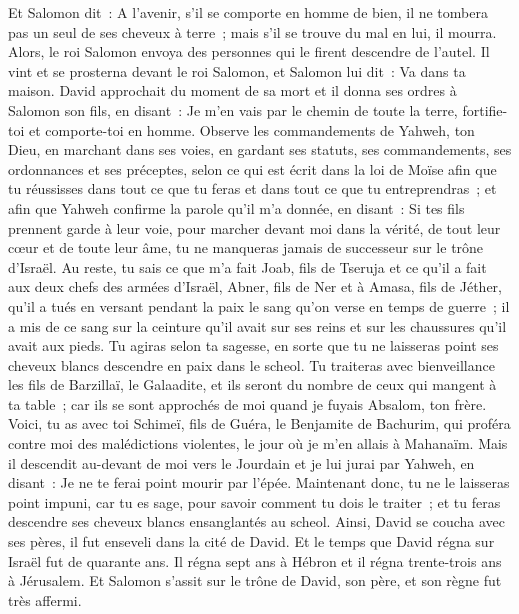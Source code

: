 \begin{multicols}{2}
Et Salomon dit~: A l'avenir, s'il se comporte en homme de bien, il ne tombera pas un seul de ses cheveux à terre~; mais s'il se trouve du mal en lui, il mourra.
Alors, le roi Salomon envoya des personnes qui le firent descendre de l'autel. Il vint et se prosterna devant le roi Salomon, et Salomon lui dit~: Va dans ta maison.
\VerseOne{}David approchait du moment de sa mort et il donna ses ordres à Salomon son fils, en disant~:
Je m'en vais par le chemin de toute la terre, fortifie-toi et comporte-toi en homme.
Observe les commandements de Yahweh, ton Dieu, en marchant dans ses voies, en gardant ses statuts, ses commandements, ses ordonnances et ses préceptes, selon ce qui est écrit dans la loi de Moïse afin que tu réussisses dans tout ce que tu feras et dans tout ce que tu entreprendras~;
et afin que Yahweh confirme la parole qu'il m'a donnée, en disant~: Si tes fils prennent garde à leur voie, pour marcher devant moi dans la vérité, de tout leur cœur et de toute leur âme, tu ne manqueras jamais de successeur sur le trône d'Israël.
Au reste, tu sais ce que m'a fait Joab, fils de Tseruja et ce qu'il a fait aux deux chefs des armées d'Israël, Abner, fils de Ner et à Amasa, fils de Jéther, qu'il a tués en versant pendant la paix le sang qu'on verse en temps de guerre~; il a mis de ce sang sur la ceinture qu'il avait sur ses reins et sur les chaussures qu'il avait aux pieds.
Tu agiras selon ta sagesse, en sorte que tu ne laisseras point ses cheveux blancs descendre en paix dans le scheol.
Tu traiteras avec bienveillance les fils de Barzillaï, le Galaadite, et ils seront du nombre de ceux qui mangent à ta table~; car ils se sont approchés de moi quand je fuyais Absalom, ton frère.
Voici, tu as avec toi Schimeï, fils de Guéra, le Benjamite de Bachurim, qui proféra contre moi des malédictions violentes, le jour où je m'en allais à Mahanaïm. Mais il descendit au-devant de moi vers le Jourdain et je lui jurai par Yahweh, en disant~: Je ne te ferai point mourir par l'épée.
Maintenant donc, tu ne le laisseras point impuni, car tu es sage, pour savoir comment tu dois le traiter~; et tu feras descendre ses cheveux blancs ensanglantés au scheol.
Ainsi, David se coucha avec ses pères, il fut enseveli dans la cité de David.
Et le temps que David régna sur Israël fut de quarante ans. Il régna sept ans à Hébron et il régna trente-trois ans à Jérusalem.
Et Salomon s'assit sur le trône de David, son père, et son règne fut très affermi.

\end{multicols}
